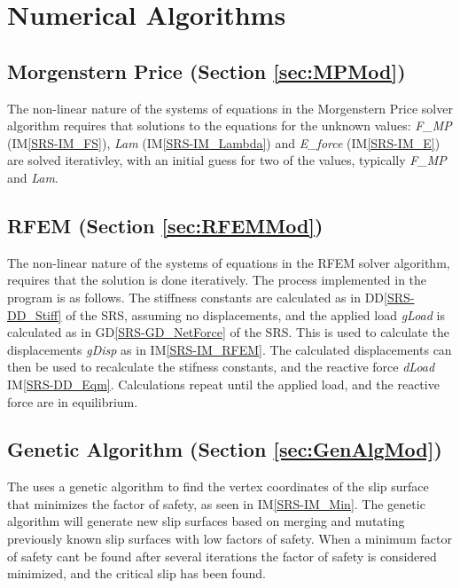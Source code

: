 \documentclass[12pt, titlepage]{article}
\begin{document}

\section{Numerical Algorithms}

\subsection*{Morgenstern Price (Section \ref{sec:MPMod})}
The non-linear nature of the systems of equations in the Morgenstern
Price solver algorithm requires that solutions to the equations for
the unknown values: \textit{F\_MP} (IM\ref{SRS-IM_FS}), \textit{Lam}
(IM\ref{SRS-IM_Lambda}) and \textit{E\_force} (IM\ref{SRS-IM_E}) are
solved iterativley, with an initial guess for two of the values,
typically \textit{F\_MP} and \textit{Lam}.

\subsection*{RFEM (Section \ref{sec:RFEMMod})}
The non-linear nature of the systems of equations in the RFEM solver
algorithm, requires that the solution is done iteratively. The
process implemented in the program is as follows. The stiffness
constants are calculated as in DD\ref{SRS-DD_Stiff} of the SRS,
assuming no displacements, and the applied load \textit{gLoad} is
calculated as in GD\ref{SRS-GD_NetForce} of the SRS. This is used to
calculate the displacements \textit{gDisp} as in
IM\ref{SRS-IM_RFEM}. The calculated displacements can then be used to
recalculate the stifness constants, and the reactive force
\textit{dLoad} IM\ref{SRS-DD_Eqm}. Calculations repeat until the
applied load, and the reactive force are in equilibrium.

\subsection*{Genetic Algorithm (Section \ref{sec:GenAlgMod})}
The uses a genetic algorithm to find the vertex coordinates of the
slip surface that minimizes the factor of safety, as seen in
IM\ref{SRS-IM_Min}. The genetic algorithm will generate new slip
surfaces based on merging and mutating previously known slip surfaces
with low factors of safety. When a minimum factor of safety cant be
found after several iterations the factor of safety is considered
minimized, and the critical slip has been found.
\end{document}
